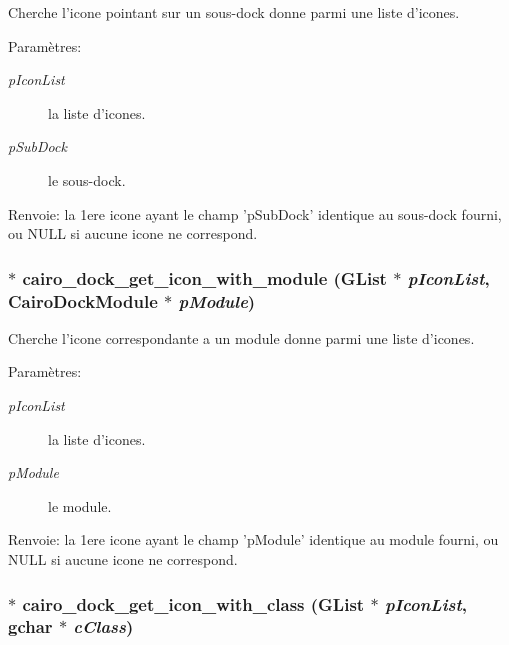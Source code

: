 Cherche l'icone pointant sur un sous-dock donne parmi une liste d'icones. \begin{Desc}
\item[Paramètres:]
\begin{description}
\item[{\em pIconList}]la liste d'icones. \item[{\em pSubDock}]le sous-dock. \end{description}
\end{Desc}
\begin{Desc}
\item[Renvoie:]la 1ere icone ayant le champ 'pSubDock' identique au sous-dock fourni, ou NULL si aucune icone ne correspond. \end{Desc}
\subsubsection{$\ast$ cairo\_\-dock\_\-get\_\-icon\_\-with\_\-module (GList $\ast$ {\em pIconList}, {\bf CairoDockModule} $\ast$ {\em pModule})}\label{cairo-dock-icons_8h_4d6bf4d25995b5e7afb89b5b47180494}


Cherche l'icone correspondante a un module donne parmi une liste d'icones. \begin{Desc}
\item[Paramètres:]
\begin{description}
\item[{\em pIconList}]la liste d'icones. \item[{\em pModule}]le module. \end{description}
\end{Desc}
\begin{Desc}
\item[Renvoie:]la 1ere icone ayant le champ 'pModule' identique au module fourni, ou NULL si aucune icone ne correspond. \end{Desc}
\subsubsection{$\ast$ cairo\_\-dock\_\-get\_\-icon\_\-with\_\-class (GList $\ast$ {\em pIconList}, gchar $\ast$ {\em cClass})}\label{cairo-dock-icons_8h_03e5049b05266883f78ceea9622e5a98}


